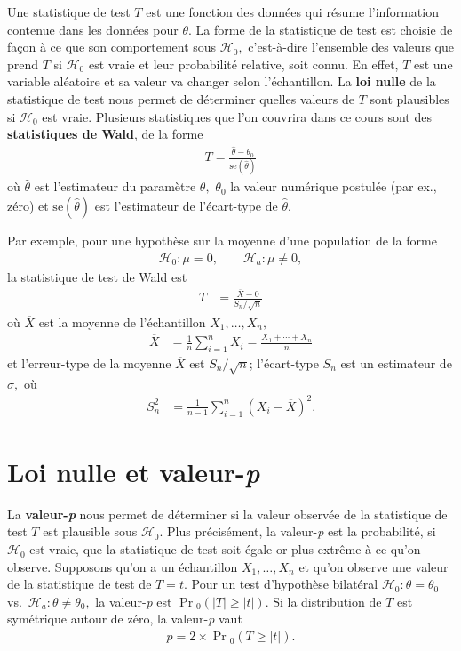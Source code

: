 \documentclass[
  11pt,
  letterpaper,
]{scrbook}
\theoremstyle{plain}
\theoremstyle{plain}
\theoremstyle{definition}
\theoremstyle{definition}
\theoremstyle{remark}
\begin{document}
Une statistique de test \(T\) est une fonction des données qui résume
l'information contenue dans les données pour \(\theta.\) La forme de la
statistique de test est choisie de façon à ce que son comportement sous
\(\mathscr{H}_0,\) c'est-à-dire l'ensemble des valeurs que prend \(T\)
si \(\mathscr{H}_0\) est vraie et leur probabilité relative, soit connu.
En effet, \(T\) est une variable aléatoire et sa valeur va changer selon
l'échantillon. La \textbf{loi nulle} de la statistique de test nous
permet de déterminer quelles valeurs de \(T\) sont plausibles si
\(\mathscr{H}_0\) est vraie. Plusieurs statistiques que l'on couvrira
dans ce cours sont des \textbf{statistiques de Wald}, de la forme
\begin{align*}
T = \frac{\widehat{\theta} - \theta_0}{\mathrm{se}(\widehat{\theta})}
\end{align*} où \(\widehat{\theta}\) est l'estimateur du paramètre
\(\theta,\) \(\theta_0\) la valeur numérique postulée (par ex., zéro) et
\(\mathrm{se}(\widehat{\theta})\) est l'estimateur de l'écart-type de
\(\widehat{\theta}.\)

Par exemple, pour une hypothèse sur la moyenne d'une population de la
forme \begin{align*}
\mathscr{H}_0: \mu=0, \qquad  \mathscr{H}_a:\mu \neq 0,
\end{align*} la statistique de test de Wald est \begin{align*}
T &= \frac{\overline{X}-0}{S_n/\sqrt{n}}
\end{align*} où \(\overline{X}\) est la moyenne de l'échantillon
\(X_1, \ldots, X_n,\) \begin{align*}
\overline{X} &= \frac{1}{n} \sum_{i=1}^n X_i = \frac{X_1+ \cdots + X_n}{n}
\end{align*} et l'erreur-type de la moyenne \(\overline{X}\) est
\(S_n/\sqrt{n}\); l'écart-type \(S_n\) est un estimateur de \(\sigma,\)
où \begin{align*}
S^2_n &= \frac{1}{n-1} \sum_{i=1}^n (X_i-\overline{X})^2.
\end{align*}

\section{\texorpdfstring{Loi nulle et
valeur-\emph{p}}{Loi nulle et valeur-p}}\label{loi-nulle-et-valeur-p}

La \textbf{valeur-\emph{p}} nous permet de déterminer si la valeur
observée de la statistique de test \(T\) est plausible sous
\(\mathscr{H}_0.\) Plus précisément, la valeur-\emph{p} est la
probabilité, si \(\mathscr{H}_0\) est vraie, que la statistique de test
soit égale or plus extrême à ce qu'on observe. Supposons qu'on a un
échantillon \(X_1, \ldots, X_n\) et qu'on observe une valeur de la
statistique de test de \(T=t.\) Pour un test d'hypothèse bilatéral
\(\mathscr{H}_0:\theta=\theta_0\)
vs.~\(\mathscr{H}_a:\theta \neq \theta_0,\) la valeur-\emph{p} est
\(\Pr{\!}_0(|T| \geq |t|).\) Si la distribution de \(T\) est symétrique
autour de zéro, la valeur-\emph{p} vaut \begin{align*}
p = 2 \times \Pr{\!}_0(T \geq |t|).
\end{align*}
\end{document}
